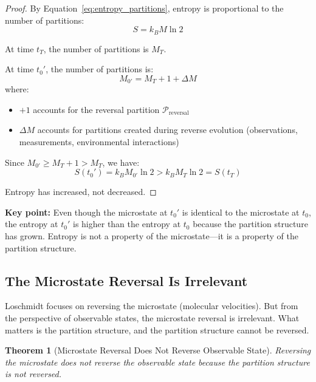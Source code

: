 \documentclass[twocolumn,10pt]{article}
\newtheorem{theorem}{Theorem}[section]
\theoremstyle{definition}
\theoremstyle{remark}
\begin{document}
\begin{proof}
By Equation~\ref{eq:entropy_partitions}, entropy is proportional to the number of partitions:
\begin{equation}
S = k_B M \ln 2
\end{equation}

At time $t_T$, the number of partitions is $M_T$.

At time $t_0'$, the number of partitions is:
\begin{equation}
M_{0'} = M_T + 1 + \Delta M
\end{equation}
where:
\begin{itemize}
\item $+1$ accounts for the reversal partition $\mathcal{P}_{\text{reversal}}$
\item $\Delta M$ accounts for partitions created during reverse evolution (observations, measurements, environmental interactions)
\end{itemize}

Since $M_{0'} \geq M_T + 1 > M_T$, we have:
\begin{equation}
S(t_0') = k_B M_{0'} \ln 2 > k_B M_T \ln 2 = S(t_T)
\end{equation}

Entropy has increased, not decreased.
\end{proof}

\noindent\textbf{Key point:} Even though the microstate at $t_0'$ is identical to the microstate at $t_0$, the entropy at $t_0'$ is higher than the entropy at $t_0$ because the partition structure has grown. Entropy is not a property of the microstate—it is a property of the partition structure.

\subsection{The Microstate Reversal Is Irrelevant}

Loschmidt focuses on reversing the microstate (molecular velocities). But from the perspective of observable states, the microstate reversal is irrelevant. What matters is the partition structure, and the partition structure cannot be reversed.

\begin{theorem}[Microstate Reversal Does Not Reverse Observable State]
\label{thm:microstate_reversal_irrelevant}
Reversing the microstate does not reverse the observable state because the partition structure is not reversed.
\end{theorem}
\end{document}
